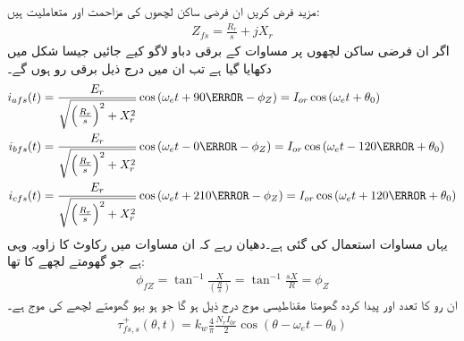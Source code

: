مزید فرض کریں ان فرضی ساکن لچھوں کی مزاحمت   اور متعاملیت   ہیں:
\begin{align}
Z_{fs}=\frac{R_r}{s}+j X_r
\end{align}
اگر ان فرضی ساکن لچھوں پر مساوات   کے برقی دباو لاگو کیے جائیں جیسا شکل   میں دکھایا گیا ہے تب ان میں درج ذیل برقی رو ہوں گے۔
\begin{gather}
\begin{aligned}
i_{afs}(t)&=\frac{E_r}{\sqrt{\left(\frac{R_r}{s} \right)^2+X_r^2}} \cos \left(\omega_e t+90\degree -\phi_Z  \right)=I_{or} \cos \left(\omega_e t+\theta_0 \right)\\
i_{bfs}(t)&=\frac{E_r}{\sqrt{\left(\frac{R_r}{s} \right)^2+X_r^2}} \cos \left(\omega_e t-0\degree -\phi_Z  \right)=I_{or}\cos \left(\omega_e t-120\degree +\theta_0 \right)\\
i_{cfs}(t)&=\frac{E_r}{\sqrt{\left(\frac{R_r}{s} \right)^2+X_r^2}} \cos \left(\omega_e t+210\degree -\phi_Z  \right)=I_{or} \cos \left(\omega_e t+120\degree+\theta_0 \right)
\end{aligned}
\end{gather}
یہاں مساوات   استعمال کی گئی ہے۔دھیان رہے کہ ان مساوات میں  رکاوٹ کا زاویہ   وہی ہے جو گھومتے لچھے کا تھا:
\begin{align}
\phi_{fZ}=\tan^{-1} \frac{X}{\left(\frac{R}{s} \right)}=\tan^{-1} \frac{s X}{R}=\phi_Z
\end{align}
ان  رو کا تعدد  اور پیدا کردہ گھومتا مقناطیسی موج درج ذیل ہو گا جو ہو بہو گھومتے لچھے کی موج  ہے۔
\begin{align}
\tau_{fs,s}^+(\theta,t)=k_w \frac{4}{\pi}\frac{N_r I_{0r}}{2} \cos (\theta-\omega_e t-\theta_0)
\end{align}

